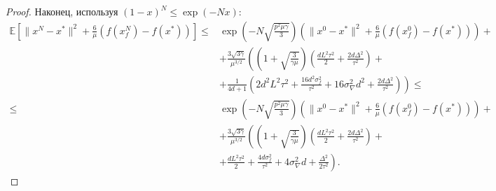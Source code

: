 \documentclass{article}
\begin{document}
\begin{proof}
Наконец, используя $(1 - x)^N \leqslant \exp(-Nx)$:
\begin{align*}
    \mathbb{E}\left[\|x^N - x^*\|^2 + \frac{6}{\mu} (f(x_f^N) - f(x^*))\right] \leqslant& \exp\left(- N\sqrt{\frac{p^2\mu\gamma}{3}}\right) \left(\|x^0 - x^*\|^2 + \frac{6}{\mu} (f(x_f^0) - f(x^*))\right) +\\
    &+ \frac{3 \sqrt{3\gamma}}{\mu^{3/2}} \left(\left(1 + \sqrt{\frac{3}{\gamma\mu}}\right) \left(\frac{d L^2 \tau^2}{2} + \frac{2d\Delta^2}{\tau^2}\right) \right.+\\
    &+\left. \frac{1}{4d + 1}\left(2 d^2 L^2 \tau^2 + \frac{16 d^2 \sigma_f^2}{\tau^2} + 16 \sigma_\nabla^2 d^2 + \frac{2d \Delta^2}{\tau^2}\right)\right)\leqslant\\
    \leqslant& \exp\left(- N\sqrt{\frac{p^2\mu\gamma}{3}}\right) \left(\|x^0 - x^*\|^2 + \frac{6}{\mu} (f(x_f^0) - f(x^*))\right) +\\
    &+ \frac{3 \sqrt{3\gamma}}{\mu^{3/2}} \left(\left(1 + \sqrt{\frac{3}{\gamma\mu}}\right) \left(\frac{d L^2 \tau^2}{2} + \frac{2d\Delta^2}{\tau^2}\right) \right.+\\
    &+\left. \frac{d L^2 \tau^2}{2} + \frac{4 d \sigma_f^2}{\tau^2} + 4 \sigma_\nabla^2 d + \frac{\Delta^2}{2\tau^2}\right).
\end{align*}
\end{proof}
\end{document}
